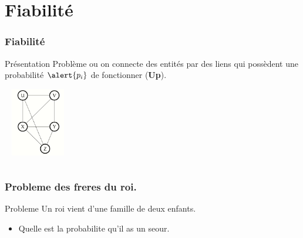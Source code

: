 \documentclass{beamer}
\begin{document}
\section{Fiabilité}
\begin{frame}[t]
  \frametitle{Fiabilité}
 \begin{block}{Présentation}
   \scriptsize
   Problème ou on connecte des entités par des liens qui possèdent une
   probabilité $\alert{p_i}$ de fonctionner (\textbf{Up}).
 \end{block} 
 \begin{center}
   \includegraphics[width=3cm, height=3cm]{graph_example.png}
 \end{center}
 \pause
 \begin{columns}
   \begin{column}{0.5\textwidth}
     \begin{center}
     \end{center}
   \end{column}
   \begin{column}{0.5\textwidth}
     \pause
     \begin{center}
     \end{center}
   \end{column}
 \end{columns}
\end{frame}
\begin{frame}[t]
  \frametitle{Probleme des freres du roi.}
  \begin{block}{Probleme}
    Un roi vient d'une famille de deux enfants.\\[4pt]
    \begin{itemize}
      \item Quelle est la probabilite qu'il as un seour.
    \end{itemize}
    
  \end{block}
\end{frame}
\end{document}
